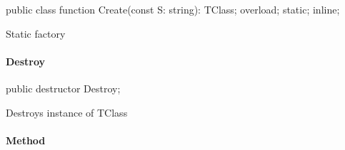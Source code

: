 \documentclass{report}
\newif\ifpdf
\begin{document}
\label{ok_parse_impl.TClass-Create}
\begin{list}{}{
\setlength{\itemindent}{0cm}
\setlength{\listparindent}{0cm}
\setlength{\leftmargin}{\evensidemargin}
\addtolength{\leftmargin}{\tmplength}
\settowidth{\labelsep}{X}
\addtolength{\leftmargin}{\labelsep}
\setlength{\labelwidth}{\tmplength}
}
\item[\textbf{Declaration}\hfill]
\ifpdf
\begin{flushleft}
\fi
\begin{ttfamily}
public class function Create(const S: string): TClass; overload; static; inline;\end{ttfamily}

\ifpdf
\end{flushleft}
\fi

\par
\item[\textbf{Description}]
Static factory

\end{list}
\paragraph*{Destroy}\hspace*{\fill}

\label{ok_parse_impl.TClass-Destroy}
\begin{list}{}{
\setlength{\itemindent}{0cm}
\setlength{\listparindent}{0cm}
\setlength{\leftmargin}{\evensidemargin}
\addtolength{\leftmargin}{\tmplength}
\settowidth{\labelsep}{X}
\addtolength{\leftmargin}{\labelsep}
\setlength{\labelwidth}{\tmplength}
}
\item[\textbf{Declaration}\hfill]
\ifpdf
\begin{flushleft}
\fi
\begin{ttfamily}
public destructor Destroy;\end{ttfamily}

\ifpdf
\end{flushleft}
\fi

\par
\item[\textbf{Description}]
Destroys instance of TClass

\end{list}
\paragraph*{Method}\hspace*{\fill}
\end{document}
